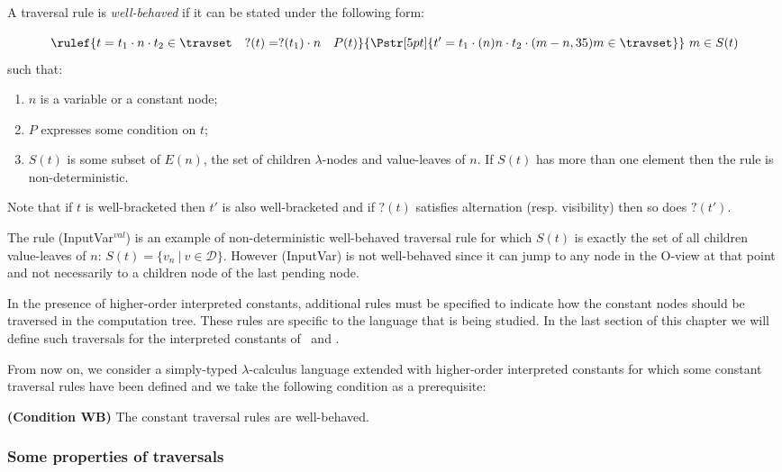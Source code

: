 \begin{dfn}
\label{def:wellbehaved_traversal}
A traversal rule is \emph{well-behaved} if it can be stated under the following form:
$$\rulef{t = t_1\cdot n \cdot t_2 \in \travset \quad ?(t) = ?(t_1) \cdot n \quad P(t)}
  { \stackrel{  \rule{0pt}{3pt} }{\Pstr[5pt]{ t' = t_1\cdot (n){n} \cdot t_2 \cdot (m-n,35){m} \in \travset}}
   }
    \ m\in S(t)
   $$
such that:
\begin{enumerate}
  \item $n$ is a variable or a constant node;
  \item $P$ expresses some condition on $t$;
  \item $S(t)$ is some subset of $E(n)$, the set of children $\lambda$-nodes and value-leaves of $n$.
  If $S(t)$ has more than one element then the rule is non-deterministic.
\end{enumerate}
\end{dfn}
Note that if $t$ is well-bracketed then $t'$ is also well-bracketed
and if $?(t)$ satisfies alternation (resp. visibility) then so does $?(t')$.


\begin{exmp} The rule (InputVar$^{val}$) is an example of non-deterministic well-behaved traversal rule for which $S(t)$ is exactly the set of all children value-leaves of $n$:
$S(t) = \{ v_n \ | \ v \in \mathcal{D} \} $.
However (InputVar) is not well-behaved since it can jump to any node in the O-view at that point and not necessarily to a children node of the last pending node.
\end{exmp}

In the presence of higher-order interpreted constants, additional rules must be specified to indicate how
the constant nodes should be traversed in the computation tree. These rules
are specific to the language that is being studied.
In the last section of this chapter we will define such traversals for the interpreted constants of
\pcf\ and \ialgol.

From now on, we consider a simply-typed $\lambda$-calculus language extended with
higher-order interpreted constants for which some constant traversal rules have been defined
and we take the following condition as a prerequisite:
\begin{center}
  \textbf{(Condition WB)} The constant traversal rules are well-behaved.
\end{center}


\subsubsection{Some properties of traversals}


